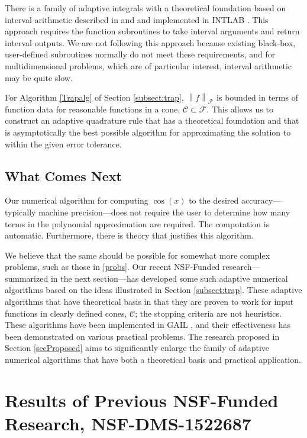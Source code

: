 \documentclass[11pt]{NSFamsart}
\newcommand{\cc}{\mathcal{C}}
\newcommand{\calf}{{\mathcal{F}}}
\newcommand{\norm}[2][{}]{\ensuremath{\left \lVert #2 \right \rVert}_{#1}}
\begin{document}
There is a family of adaptive integrals with a theoretical foundation based on interval 
arithmetic 
described in \cite{MoKeCl09} and \cite{Rum10a} and implemented in INTLAB \cite{Rum99a}.  
This 
approach requires the function subroutines to take interval arguments and return interval 
outputs.  
We are not following this approach because existing black-box, user-defined subroutines 
normally 
do not meet these requirements, and for multidimensional problems, which are of particular 
interest, 
interval arithmetic may be quite slow.

For Algorithm \ref{Trapalg}  of Section \ref{subsect:trap}, $\norm[\calf]{f}$ is bounded in 
terms of function data for reasonable functions in a cone, $\cc \subset \calf$. This allows us 
to 
construct an adaptive quadrature rule that has a theoretical foundation and that is 
asymptotically the best possible algorithm for 
approximating the solution to within the given error tolerance.  


\subsection{What Comes Next}
Our numerical algorithm for computing $\cos(x)$ to the desired accuracy---typically machine 
precision---does not require the user to determine how many terms in the polynomial 
approximation are required.  The computation is automatic.  Furthermore, there is theory 
that justifies this algorithm.  

We believe that the same should be possible for somewhat more complex problems, such as 
those in \eqref{probs}.
Our recent NSF-Funded research---summarized in the next section---has developed 
some such adaptive numerical algorithms based on the ideas illustrated in Section 
\ref{subsect:trap}.  These adaptive algorithms that have theoretical basis in that they are 
proven to work for input functions in clearly defined cones, $\cc$; the stopping criteria are 
not heuristics. These algorithms have been implemented in GAIL \cite{ChoEtal17b}, and their 
effectiveness has been demonstrated on various practical problems.  The research proposed 
in Section \ref{secProposed} aims to significantly enlarge the family of adaptive numerical 
algorithms that have both a theoretical basis and practical application.

\section{Results of Previous NSF-Funded Research,
NSF-DMS-1522687} \label{SectPrevious}
\end{document}
